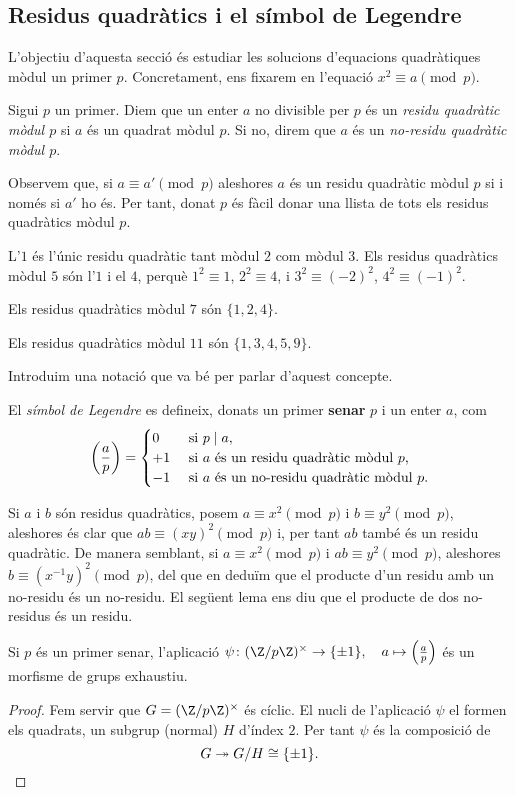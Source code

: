\subsection{Residus quadràtics i el símbol de Legendre}

L'objectiu d'aquesta secció és estudiar les solucions d'equacions quadràtiques mòdul un primer $p$. Concretament, ens fixarem en l'equació $x^2\equiv a\pmod{p}$.

\begin{definition}
 Sigui $p$ un primer. Diem que un enter $a$ no divisible per $p$ és un \emph{residu quadràtic mòdul $p$} si $a$ és un quadrat mòdul $p$. Si no, direm que $a$ és un \emph{no-residu quadràtic mòdul $p$}.
\end{definition}

Observem que, si $a\equiv a'\pmod{p}$ aleshores $a$ és un residu quadràtic mòdul $p$ si i només si $a'$ ho és. Per tant, donat $p$ és fàcil donar una llista de tots els residus quadràtics mòdul $p$.

\begin{example}
L'$1$ és l'únic residu quadràtic tant mòdul $2$ com mòdul $3$.
Els residus quadràtics mòdul $5$ són l'$1$ i el $4$, perquè $1^2\equiv 1$, $2^2\equiv 4$, i $3^2\equiv (-2)^2$, $4^2 \equiv (-1)^2$.

Els residus quadràtics mòdul $7$ són $\{1,2,4\}$.

Els residus quadràtics mòdul $11$ són $\{1,3,4,5,9\}$.
\end{example}

Introduim una notació que va bé per parlar d'aquest concepte.

\begin{definition}
El \emph{símbol de Legendre} es defineix, donats un primer \textbf{senar} $p$ i un enter $a$, com
\[
\left(\frac{a}{p}\right)=\begin{cases}
0 &\text{ si } p\mid a,\\
+1 &\text{ si $a$ és un residu quadràtic mòdul $p$,}\\
-1&\text{ si $a$ és un no-residu quadràtic mòdul $p$}.
\end{cases}
\]
\end{definition}

Si $a$ i $b$ són residus quadràtics, posem $a\equiv x^2\pmod p$ i $b\equiv y^2\pmod p$, aleshores és clar que $ab\equiv (xy)^2\pmod p$ i, per tant $ab$ també és un residu quadràtic. De manera semblant, si $a\equiv x^2\pmod p$ i $ab\equiv y^2\pmod p$, aleshores $b\equiv (x^{-1}y)^2\pmod p$, del que en deduïm que el producte d'un residu amb un no-residu és un no-residu. El següent lema ens diu que el producte de dos no-residus és un residu.
\begin{lemma}
Si $p$ és un primer senar, l'aplicació $\psi\colon (\Z/p\Z)^\times \to \{\pm 1\},\quad a\mapsto \legendre{a}{p}$ és un morfisme de grups exhaustiu.
\end{lemma}
\begin{proof}
Fem servir que $G = (\Z/p\Z)^\times$ és cíclic. El nucli de l'aplicació $\psi$ el formen els quadrats, un subgrup (normal) $H$ d'índex $2$. Per tant $\psi$ és la composició de
\[
G\twoheadrightarrow G/H \cong \{\pm 1\}.
\]
\end{proof}

